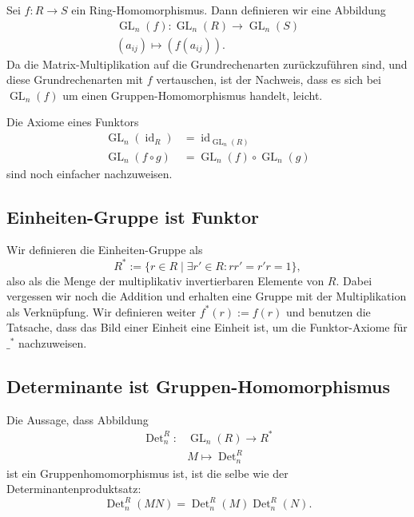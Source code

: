 \documentclass[a4paper]{amsart}
\theoremstyle{definition}
\DeclareMathOperator{\id}{id}
\DeclareMathOperator{\Det}{Det}
\DeclareMathOperator{\GL}{GL}
\begin{document}
Sei $f \colon R \to S$ ein Ring-Homomorphismus. Dann definieren wir eine Abbildung 
\begin{align}
   \GL_n(f) \colon \GL_n( R ) \to \GL_n( S )\\
   (a_{ij}) \mapsto (f( a_{ij} )).
\end{align}
Da die Matrix-Multiplikation auf die Grundrechenarten zurückzuführen sind, und diese Grundrechenarten mit $f$ vertauschen, ist der Nachweis, dass es sich bei $\GL_n(f)$ um einen Gruppen-Homomorphismus handelt, leicht.

Die Axiome eines Funktors
\begin{align}
   \GL_n(\id_R) &= \id_{\GL_n( R )}\\
   \GL_n(f \circ g) &= \GL_n(f) \circ \GL_n(g)
\end{align}
sind noch einfacher nachzuweisen.

\subsection{Einheiten-Gruppe ist Funktor}
Wir definieren die Einheiten-Gruppe als
\begin{equation}
   R^* := \{r \in R \mid \exists r' \in R \colon rr' = r'r = 1 \},
\end{equation}
also als die Menge der multiplikativ invertierbaren Elemente von $R$. Dabei vergessen wir noch die Addition und erhalten eine Gruppe mit der Multiplikation als Verknüpfung. Wir definieren weiter $f^*(r) :=  f(r)$ und benutzen die Tatsache, dass das Bild einer Einheit eine Einheit ist, um die Funktor-Axiome für $\_^*$ nachzuweisen.

\subsection{Determinante ist Gruppen-Homomorphismus}
Die Aussage, dass Abbildung
\begin{align}
   \Det_n^R \colon &\GL_n(R) \to R^*\\
                   &M \mapsto \Det_n^R 
\end{align}
ist ein Gruppenhomomorphismus ist, ist die selbe wie der Determinantenproduktsatz:
\begin{equation}
   \Det_n^R(MN) = \Det_n^R(M) \Det_n^R(N).
\end{equation} 
\end{document}
